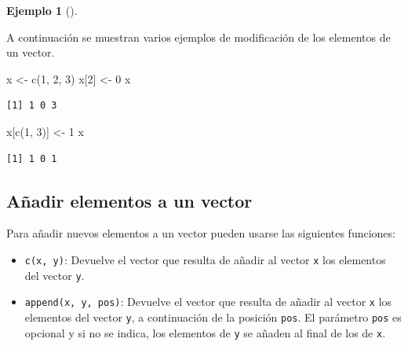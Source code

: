 \documentclass[
  a4paper,
]{scrreport}
\newenvironment{Shaded}{\begin{snugshade}}{\end{snugshade}}
\newcommand{\DecValTok}[1]{\textcolor[rgb]{0.68,0.00,0.00}{#1}}
\newcommand{\FunctionTok}[1]{\textcolor[rgb]{0.28,0.35,0.67}{#1}}
\newcommand{\NormalTok}[1]{\textcolor[rgb]{0.00,0.23,0.31}{#1}}
\newcommand{\OtherTok}[1]{\textcolor[rgb]{0.00,0.23,0.31}{#1}}
\providecommand{\tightlist}{%
  \setlength{\itemsep}{0pt}\setlength{\parskip}{0pt}}\usepackage{longtable,booktabs,array}
\theoremstyle{definition}
\newtheorem{example}{Ejemplo}[chapter]
\theoremstyle{definition}
\theoremstyle{remark}
\begin{document}
\leavevmode{}%
\begin{example}[]\label{exm-modificacion-vectores}

A continuación se muestran varios ejemplos de modificación de los
elementos de un vector.

\begin{Shaded}
\begin{Highlighting}[]
\NormalTok{x }\OtherTok{\textless{}{-}} \FunctionTok{c}\NormalTok{(}\DecValTok{1}\NormalTok{, }\DecValTok{2}\NormalTok{, }\DecValTok{3}\NormalTok{)}
\NormalTok{x[}\DecValTok{2}\NormalTok{] }\OtherTok{\textless{}{-}} \DecValTok{0}
\NormalTok{x}
\end{Highlighting}
\end{Shaded}

\begin{verbatim}
[1] 1 0 3
\end{verbatim}

\begin{Shaded}
\begin{Highlighting}[]
\NormalTok{x[}\FunctionTok{c}\NormalTok{(}\DecValTok{1}\NormalTok{, }\DecValTok{3}\NormalTok{)] }\OtherTok{\textless{}{-}} \DecValTok{1}
\NormalTok{x}
\end{Highlighting}
\end{Shaded}

\begin{verbatim}
[1] 1 0 1
\end{verbatim}

\end{example}

\hypertarget{auxf1adir-elementos-a-un-vector}{%
\subsection{Añadir elementos a un
vector}\label{auxf1adir-elementos-a-un-vector}}

Para añadir nuevos elementos a un vector pueden usarse las siguientes
funciones:

\begin{itemize}
\tightlist
\item
  \texttt{c(x,\ y)}: Devuelve el vector que resulta de añadir al vector
  \texttt{x} los elementos del vector \texttt{y}.
\item
  \texttt{append(x,\ y,\ pos)}: Devuelve el vector que resulta de añadir
  al vector \texttt{x} los elementos del vector \texttt{y}, a
  continuación de la posición \texttt{pos}. El parámetro \texttt{pos} es
  opcional y si no se indica, los elementos de \texttt{y} se añaden al
  final de los de \texttt{x}.
\end{itemize}
\end{document}
